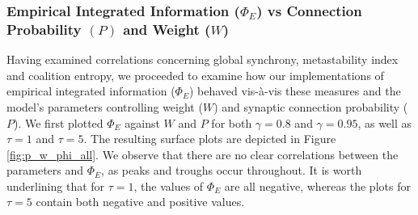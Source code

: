 \documentclass[a4paper,11pt]{article}
\begin{document}
\subsubsection{Empirical Integrated Information ($\Phi_E$) vs Connection Probability $(P)$ and Weight ($W$)}
\label{sec:app:snn:res:phi-p-w}
Having examined correlations concerning global synchrony, metastability index and coalition entropy, we proceeded to examine how our implementations of empirical integrated information ($\Phi_E$) behaved vis-\`{a}-vis these measures and the model's parameters controlling weight ($W$) and synaptic connection probability ($P$). We first plotted $\Phi_E$ against $W$ and $P$ for both $\gamma = 0.8$ and $\gamma = 0.95$, as well as $\tau = 1$ and $\tau = 5$. The resulting surface plots are depicted in Figure \ref{fig:p_w_phi_all}. We observe that there are no clear correlations between the parameters and $\Phi_E$, as peaks and troughs occur throughout. It is worth underlining that for $\tau = 1$, the values of $\Phi_E$ are all negative, whereas the plots for $\tau = 5$ contain both negative and positive values.
\end{document}
